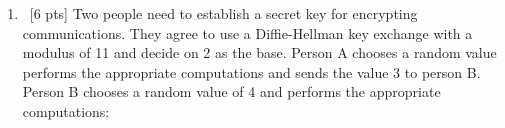 \documentclass[12pt]{article}
\newenvironment{sol}[1][Solution]{\begin{trivlist}\item[\hskip\labelsep {\bfseries #1:}]}{\end{trivlist}}
\begin{document}
\begin{enumerate}
    \item \ [6 pts] Two people need to establish a secret key for encrypting communications. They agree to use a Diffie-Hellman key exchange with a modulus of 11 and decide on 2 as the base. Person A chooses a random value performs the appropriate computations and sends the value 3 to person B. Person B chooses a random value of 4 and performs the appropriate computations:


\end{enumerate}
\end{document}
